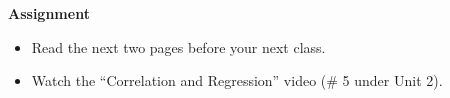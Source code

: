 \noindent
{\bf Assignment} \vspace{-.2in}
\begin{itemize}
\item Read the next two pages before your next class.
\item Watch the ``Correlation and Regression'' video (\# 5 under Unit 2).
\end{itemize}
